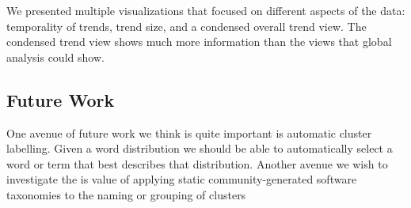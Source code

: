\documentclass[times, 10pt,twocolumn]{article}
\begin{document}
We presented multiple visualizations that focused on different
aspects of the data: temporality of trends, trend size, and a
condensed overall trend view. The condensed trend view shows much more
information than the views that global analysis could show.


\subsection{ Future Work}

One avenue of future work we think is quite important is automatic
cluster labelling. Given a word distribution we should be able to
automatically select a word or term that best describes that distribution.
Another avenue we wish to investigate the is value of applying
static community-generated software taxonomies to the naming or
grouping of clusters







%


\end{document}
